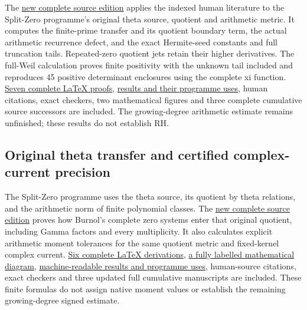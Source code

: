 \documentclass[
]{article}
\begin{document}
The
\href{https://github.com/KokunoYumeto/zeta-function-research-reader/blob/main/workbenches/splitzero-tandem/continuations/20260920-semilocal-prolate-weil/README.md}{new
complete source edition} applies the indexed human literature to the
Split-Zero programme's original theta source, quotient and arithmetic
metric. It computes the finite-prime transfer and its quotient boundary
term, the actual arithmetic recurrence defect, and the exact
Hermite-seed constants and full truncation tails. Repeated-zero quotient
jets retain their higher derivatives. The full-Weil calculation proves
finite positivity with the unknown tail included and reproduces 45
positive determinant enclosures using the complete xi function.
\href{https://github.com/KokunoYumeto/zeta-function-research-reader/blob/main/workbenches/splitzero-tandem/continuations/20260920-semilocal-prolate-weil/COMPLETE_PROOFS.tex}{Seven
complete LaTeX proofs},
\href{https://github.com/KokunoYumeto/zeta-function-research-reader/blob/main/workbenches/splitzero-tandem/continuations/20260920-semilocal-prolate-weil/RESULT_INDEX.json}{results
and their programme uses}, human citations, exact checkers, two
mathematical figures and three complete cumulative source successors are
included. The growing-degree arithmetic estimate remains unfinished;
these results do not establish RH.

\subsection{Original theta transfer and certified complex-current
precision}\label{original-theta-transfer-and-certified-complex-current-precision}

The Split-Zero programme uses the theta source, its quotient by theta
relations, and the arithmetic norm of finite polynomial classes. The
\href{https://github.com/KokunoYumeto/zeta-function-research-reader/blob/main/workbenches/splitzero-tandem/continuations/20260920-theta-transfer-current-precision/README.md}{new
complete source edition} proves how Burnol's complete zero systems enter
that original quotient, including Gamma factors and every multiplicity.
It also calculates explicit arithmetic moment tolerances for the same
quotient metric and fixed-kernel complex current.
\href{https://github.com/KokunoYumeto/zeta-function-research-reader/blob/main/workbenches/splitzero-tandem/continuations/20260920-theta-transfer-current-precision/COMPLETE_PROOFS.tex}{Six
complete LaTeX derivations},
\href{https://github.com/KokunoYumeto/zeta-function-research-reader/blob/main/workbenches/splitzero-tandem/continuations/20260920-theta-transfer-current-precision/FIGURE_CAPTION.md}{a
fully labelled mathematical diagram},
\href{https://github.com/KokunoYumeto/zeta-function-research-reader/blob/main/workbenches/splitzero-tandem/continuations/20260920-theta-transfer-current-precision/RESULT_INDEX.json}{machine-readable
results and programme uses}, human-source citations, exact checkers and
three updated full cumulative manuscripts are included. These finite
formulas do not assign native moment values or establish the remaining
growing-degree signed estimate.
\end{document}
